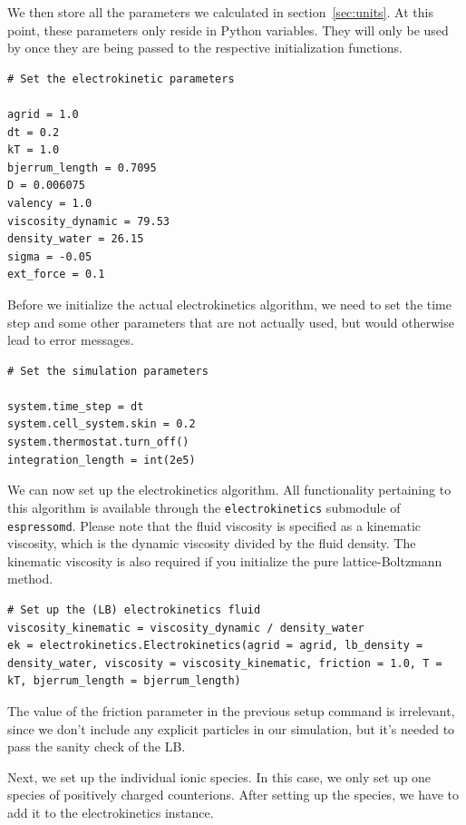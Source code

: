 We then store all the parameters we calculated in section~\ref{sec:units}. At this point, these parameters only reside in Python variables. They will only be used by \ES{} once they are being passed to the respective initialization functions.

\begin{lstlisting}[firstnumber=19]
# Set the electrokinetic parameters

agrid = 1.0
dt = 0.2
kT = 1.0
bjerrum_length = 0.7095
D = 0.006075
valency = 1.0
viscosity_dynamic = 79.53
density_water = 26.15
sigma = -0.05
ext_force = 0.1
\end{lstlisting}

Before we initialize the actual electrokinetics algorithm, we need to set the time step and some other parameters that are not actually used, but would otherwise lead to error messages.

\begin{lstlisting}[firstnumber=32]
# Set the simulation parameters

system.time_step = dt
system.cell_system.skin = 0.2
system.thermostat.turn_off()
integration_length = int(2e5)
\end{lstlisting}

We can now set up the electrokinetics algorithm. All functionality pertaining to this algorithm is available through the \texttt{electrokinetics} submodule of \texttt{espressomd}. Please note that the fluid viscosity is specified as a kinematic viscosity, which is the dynamic viscosity divided by the fluid density. The kinematic viscosity is also required if you initialize the pure lattice-Boltzmann method.

\begin{lstlisting}[firstnumber=39]
# Set up the (LB) electrokinetics fluid
viscosity_kinematic = viscosity_dynamic / density_water
ek = electrokinetics.Electrokinetics(agrid = agrid, lb_density = density_water, viscosity = viscosity_kinematic, friction = 1.0, T = kT, bjerrum_length = bjerrum_length)
\end{lstlisting}

The value of the friction parameter in the previous setup command is irrelevant, since we don't include any explicit particles in our simulation, but it's needed to pass the sanity check of the LB.

Next, we set up the individual ionic species. In this case, we only set up one species of positively charged counterions. After setting up the species, we have to add it to the electrokinetics instance. 

